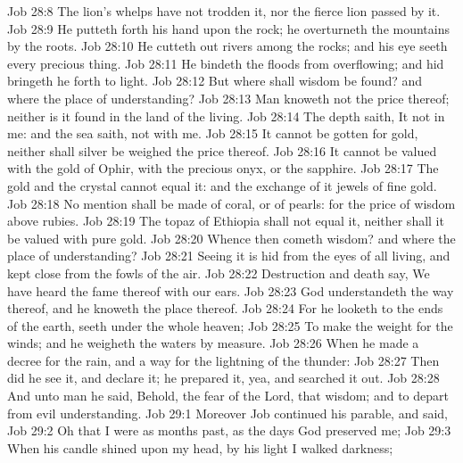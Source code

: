 \vs Job 28:8 The lion's whelps have not trodden it, nor the fierce lion passed by it.
\vs Job 28:9 He putteth forth his hand upon the rock; he overturneth the mountains by the roots.
\vs Job 28:10 He cutteth out rivers among the rocks; and his eye seeth every precious thing.
\vs Job 28:11 He bindeth the floods from overflowing; and  hid bringeth he forth to light.
\vs Job 28:12 But where shall wisdom be found? and where  the place of understanding?
\vs Job 28:13 Man knoweth not the price thereof; neither is it found in the land of the living.
\vs Job 28:14 The depth saith, It  not in me: and the sea saith,  not with me.
\vs Job 28:15 It cannot be gotten for gold, neither shall silver be weighed  the price thereof.
\vs Job 28:16 It cannot be valued with the gold of Ophir, with the precious onyx, or the sapphire.
\vs Job 28:17 The gold and the crystal cannot equal it: and the exchange of it  jewels of fine gold.
\vs Job 28:18 No mention shall be made of coral, or of pearls: for the price of wisdom  above rubies.
\vs Job 28:19 The topaz of Ethiopia shall not equal it, neither shall it be valued with pure gold.
\vs Job 28:20 Whence then cometh wisdom? and where  the place of understanding?
\vs Job 28:21 Seeing it is hid from the eyes of all living, and kept close from the fowls of the air.
\vs Job 28:22 Destruction and death say, We have heard the fame thereof with our ears.
\vs Job 28:23 God understandeth the way thereof, and he knoweth the place thereof.
\vs Job 28:24 For he looketh to the ends of the earth,  seeth under the whole heaven;
\vs Job 28:25 To make the weight for the winds; and he weigheth the waters by measure.
\vs Job 28:26 When he made a decree for the rain, and a way for the lightning of the thunder:
\vs Job 28:27 Then did he see it, and declare it; he prepared it, yea, and searched it out.
\vs Job 28:28 And unto man he said, Behold, the fear of the Lord, that  wisdom; and to depart from evil  understanding.
\vs Job 29:1 Moreover Job continued his parable, and said,
\vs Job 29:2 Oh that I were as  months past, as  the days  God preserved me;
\vs Job 29:3 When his candle shined upon my head,  by his light I walked  darkness;
